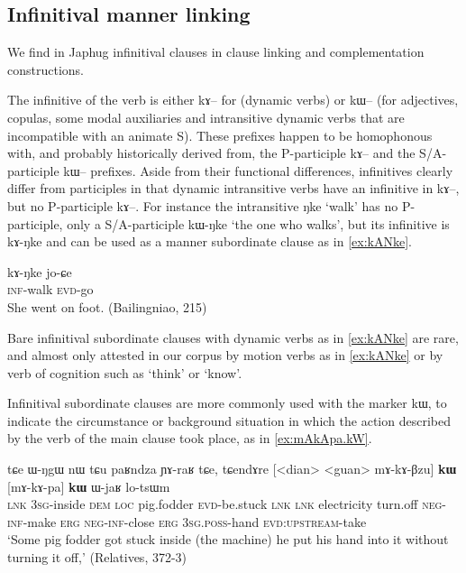\documentclass[oldfontcommands,oneside,a4paper,11pt]{article}
\newcommand{\ipa}[1]{{\phon #1}} %
\begin{document}
 \subsection{Infinitival manner linking} \label{sec:manner}
We find in Japhug infinitival clauses in clause linking and complementation constructions.

The infinitive of the verb is either \ipa{kɤ--} for (dynamic verbs) or \ipa{kɯ--} (for adjectives, copulas, some modal auxiliaries and intransitive dynamic verbs that are incompatible with an animate S). These prefixes happen to be homophonous with, and probably historically derived from, the P-participle \ipa{kɤ--} and the S/A-participle \ipa{kɯ--} prefixes. Aside from their functional differences, infinitives clearly differ from participles in that dynamic intransitive verbs have an infinitive in \ipa{kɤ--}, but no P-participle \ipa{kɤ--}. For instance the intransitive \ipa{ŋke} `walk' has no P-participle, only a S/A-participle \ipa{kɯ-ŋke} `the one who walks', but its infinitive is \ipa{kɤ-ŋke} and can be used as a manner subordinate clause as in \ref{ex:kANke}.

\begin{exe}
\ex \label{ex:kANke}
\gll
\ipa{kɤ-ŋke} \ipa{jo-ɕe} \\
\textsc{inf}-walk \textsc{evd}-go \\
\glt She went on foot. (Bailingniao, 215)
\end{exe} 

Bare infinitival subordinate clauses with dynamic verbs as in \ref{ex:kANke} are rare, and almost only attested in our corpus by motion verbs as in \ref{ex:kANke} or by verb of cognition such as `think' or `know'.

 Infinitival subordinate clauses are more commonly used with the marker \ipa{kɯ}, to indicate the circumstance or background situation in which the action described by the verb of the main clause took place, as in \ref{ex:mAkApa.kW}. 

\begin{exe}
\ex \label{ex:mAkApa.kW}
\gll
\ipa{tɕe}   	\ipa{ɯ-ŋgɯ}   	\ipa{nɯ} \ipa{tɕu}   	\ipa{paʁndza}   	\ipa{ɲɤ-raʁ}   	\ipa{tɕe,}   	\ipa{tɕendɤre}   	[<dian>   	<guan>   	\ipa{mɤ-kɤ-βzu}] 	\ipa{\textbf{kɯ}}   	[\ipa{mɤ-kɤ-pa}]   	\ipa{\textbf{kɯ}}   	\ipa{ɯ-jaʁ}   	\ipa{lo-tsɯm}   \\
\textsc{lnk} \textsc{3sg}-inside \textsc{dem} \textsc{loc} pig.fodder \textsc{evd}-be.stuck \textsc{lnk}
\textsc{lnk} electricity turn.off \textsc{neg-inf}-make \textsc{erg}  \textsc{neg-inf}-close \textsc{erg}  \textsc{3sg.poss}-hand \textsc{evd:upstream}-take \\
\glt `Some pig fodder got stuck inside (the machine) he put his hand into it without turning it off,' (Relatives, 372-3)
\end{exe} 
\end{document}
